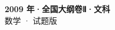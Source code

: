 \documentclass[zihao=-4, a4paper]{ctexart}
\begin{document}
\begin{center}
  {\Large\bfseries 2009 年·全国大纲卷Ⅱ·文科}\\[4pt]
  {\large 数学 · 试题版}
\end{center}
\medskip
{}

\end{document}
